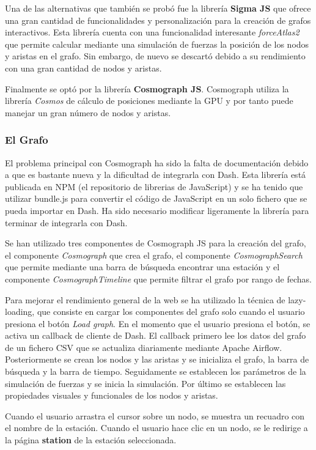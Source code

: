 Una de las alternativas que también se probó fue la librería \textbf{Sigma JS} que ofrece una gran cantidad de funcionalidades y personalización para la creación de grafos interactivos. Esta librería cuenta con una funcionalidad interesante \textit{forceAtlas2} que permite calcular mediante una simulación de fuerzas la posición de los nodos y aristas en el grafo. Sin embargo, de nuevo se descartó debido a su rendimiento con una gran cantidad de nodos y aristas.

Finalmente se optó por la librería \textbf{Cosmograph JS}. Cosmograph utiliza la librería \textit{Cosmos} de cálculo de posiciones mediante la GPU y por tanto puede manejar un gran número de nodos y aristas.

\subsubsection*{El Grafo}
El problema principal con Cosmograph ha sido la falta de documentación debido a que es bastante nueva y la dificultad de integrarla con Dash. Esta librería está publicada en NPM (el repositorio de librerias de JavaScript) y se ha tenido que utilizar bundle.js para convertir el código de JavaScript en un solo fichero que se pueda importar en Dash. Ha sido necesario modificar ligeramente la librería para terminar de integrarla con Dash.

Se han utilizado tres componentes de Cosmograph JS para la creación del grafo, el componente \textit{Cosmograph} que crea el grafo, el componente \textit{CosmographSearch} que permite mediante una barra de búsqueda encontrar una estación y el componente \textit{CosmographTimeline} que permite filtrar el grafo por rango de fechas.

Para mejorar el rendimiento general de la web se ha utilizado la técnica de lazy-loading, que consiste en cargar los componentes del grafo solo cuando el usuario presiona el botón \textit{Load graph}. En el momento que el usuario presiona el botón, se activa un callback de cliente de Dash. El callback primero lee los datos del grafo de un fichero CSV que se actualiza diariamente mediante Apache Airflow. Posteriormente se crean los nodos y las aristas y se inicializa el grafo, la barra de búsqueda y la barra de tiempo. Seguidamente se establecen los parámetros de la simulación de fuerzas y se inicia la simulación. Por último se establecen las propiedades visuales y funcionales de los nodos y aristas.

Cuando el usuario arrastra el cursor sobre un nodo, se muestra un recuadro con el nombre de la estación. Cuando el usuario hace clic en un nodo, se le redirige a la página \textbf{station} de la estación seleccionada.

